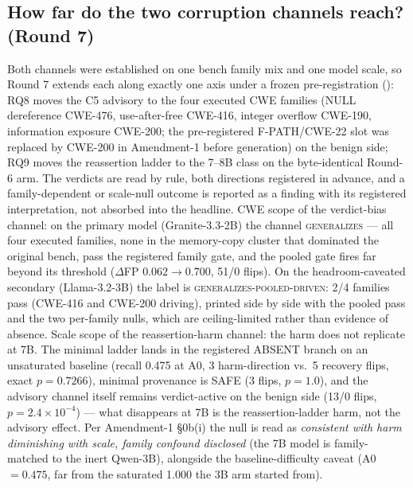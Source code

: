 \subsection{How far do the two corruption channels reach? (Round 7)}
\label{sec:round7scope}
Both channels were established on one bench family mix and one model
scale, so Round 7 extends each along exactly one axis under a frozen
pre-registration (): RQ8 moves the C5
advisory to the four executed CWE families (NULL dereference CWE-476,
use-after-free CWE-416, integer overflow CWE-190, information exposure
CWE-200; the pre-registered F-PATH/CWE-22 slot was replaced by CWE-200 in
Amendment-1 before generation) on the benign side; RQ9 moves the reassertion
ladder to the 7--8B class on the byte-identical Round-6 arm. The verdicts
are read by rule, both directions registered in advance, and a
family-dependent or scale-null outcome is reported as a finding with its
registered interpretation, not absorbed into the headline.
CWE scope of the verdict-bias channel:
on the primary model (Granite-3.3-2B) the channel \textsc{generalizes} ---
all four executed families, none in the memory-copy cluster that dominated
the original bench, pass the registered family gate, and the pooled gate
fires far beyond its threshold ($\Delta$FP $0.062\rightarrow0.700$, 51/0
flips). On the headroom-caveated secondary (Llama-3.2-3B) the label is
\textsc{generalizes-pooled-driven}: 2/4 families pass (CWE-416 and CWE-200
driving), printed side by side with the pooled pass and the two per-family
nulls, which are ceiling-limited rather than evidence of absence.
Scale scope of the reassertion-harm channel:
the harm does not replicate at 7B. The minimal ladder lands in the
registered ABSENT branch on an unsaturated baseline (recall 0.475 at A0,
3 harm-direction vs.\ 5 recovery flips, exact $p=0.7266$), minimal
provenance is SAFE (3 flips, $p=1.0$), and the advisory channel itself
remains verdict-active on the benign side (13/0 flips,
$p=2.4\times10^{-4}$) --- what disappears at 7B is the
reassertion-ladder harm, not the advisory effect. Per Amendment-1
\S0b(i) the null is read as \emph{consistent with harm diminishing with
scale, family confound disclosed} (the 7B model is family-matched to the
inert Qwen-3B), alongside the baseline-difficulty caveat (A0 $=0.475$,
far from the saturated 1.000 the 3B arm started from).

